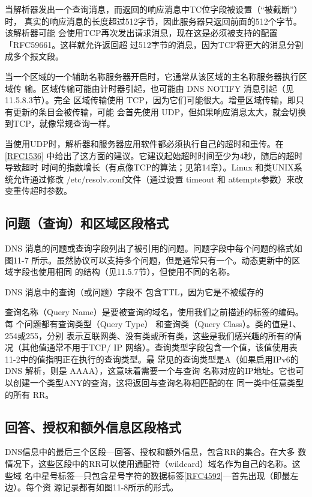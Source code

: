 当解析器发出一个查询消息，而返回的响应消息中TC位字段被设置（“被截断”）时，
真实的响应消息的长度超过512字节，因此服务器只返回前面的512个字节。该解析器可能
会使用TCP再次发出请求消息，现在这是必须被支持的配置「RFC59661。这样就允许返回超
过512字节的消息，因为TCP将更大的消息分割成多个报文段。

当一个区域的一个辅助名称服务器开启时，它通常从该区域的主名称服务器执行区域传
输。区域传输可能由计时器引起，也可能由 DNS NOTIFY 消息引起（见11.5.8.3节）。完全
区域传输使用 TCP，因为它们可能很大。增量区域传输，即只有更新的条目会被传输，可能
会首先使用 UDP，但如果响应消息太大，就会切换到TCP，就像常规查询一样。

当使用UDP时，解析器和服务器应用软件都必须执行自己的超时和重传。在
\href{https://www.rfc-editor.org/rfc/rfc1536}{[RFC1536]}
中给出了这方面的建议。它建议起始超时时间至少为4秒，随后的超时导致超时
时间的指数增长（有点像TCP的算法；见第14章）。Linux 和类UNIX系统允许通过修改
/etc/resolv.conf文件（通过设置 timeout 和 attempts参数）来改变重传超时参数。

\subsection{问题（查询）和区域区段格式}

DNS 消息的问题或查询字段列出了被引用的问题。问题字段中每个问题的格式如图11-7
所示。虽然协议可以支持多个问题，但是通常只有一个。动态更新中的区域字段也使用相同
的结构（见11.5.7节），但使用不同的名称。

DNS 消息中的查询（或问题）字段不
包含TTL，因为它是不被缓存的

查询名称（Query Name）是要被查询的域名，使用我们之前描述的标签的编码。每
个问题都有查询类型（Query Type） 和查询类（Query Class）。类的值是1、254或255，分别
表示互联网类、没有类或所有类，这些是我们感兴趣的所有的情况（其他值通常不用于TCP/
IP 网络）。查询类型字段包含一个值，该值使用表11-2中的值指明正在执行的查询类型。最
常见的查询类型是A（如果启用IPv6的 DNS 解析，则是 AAAA），这意味着需要一个与查询
名称对应的IP地址。它也可以创建一个类型ANY的查询，这将返回与查询名称相匹配的在
同一类中任意类型的所有 RR。

\subsection{回答、授权和额外信息区段格式}

DNS信息中的最后三个区段—回答、授权和额外信息，包含RR的集合。在大多
数情况下，这些区段中的RR可以使用通配符（wildcard）域名作为自己的名称。这些域
名中星号标签—只包含星号字符的数据标签\href{https://www.rfc-editor.org/rfc/rfc4592}{[RFC4592]}—首先出现（即最左边）。每个资
源记录都有如图11-8所示的形式。

